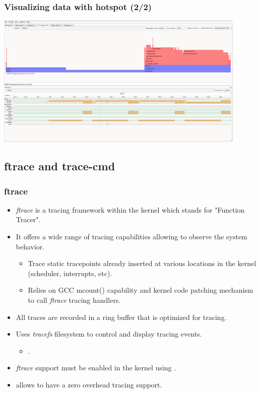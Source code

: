 \begin{frame}[fragile]
  \frametitle{Visualizing data with hotspot (2/2)}
  \center \includegraphics[width=0.9\textwidth]{slides/debugging-system-wide-profiling/hotspot.png}\\
\end{frame}

\subsection{ftrace and trace-cmd}

\begin{frame}
  \frametitle{ftrace}
  \begin{itemize}
    \item {\em ftrace} is a tracing framework within the kernel which stands for
          "Function Tracer".
    \item It offers a wide range of tracing capabilities allowing to observe the
          system behavior.
    \begin{itemize}
      \item Trace static tracepoints already inserted at various locations
            in the kernel (scheduler, interrupts, etc).
      \item Relies on GCC mcount() capability and kernel code patching mechanism
            to call {\em ftrace} tracing handlers.
    \end{itemize}
    \item All traces are recorded in a ring buffer that is optimized for tracing.
    \item Uses {\em tracefs} filesystem to control and display tracing events.
    \begin{itemize}
      \item {}.
    \end{itemize}
    \item {\em ftrace} support must be enabled in the kernel using
          .
    \item {} allows to have a zero overhead tracing
          support.
  \end{itemize}
\end{frame}

